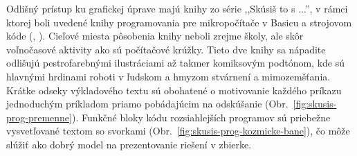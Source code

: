 Odlišný prístup ku grafickej úprave majú knihy zo série ,,Skúsiš to s ...'', v rámci ktorej boli uvedené knihy programovania pre mikropočítače v Basicu a strojovom kóde (\cite{tatchellova_skusis_1990}, \cite{wattsova_skusis_1991}). Cieľové miesta pôsobenia knihy neboli zrejme školy, ale skôr voľnočasové aktivity ako sú počítačové krúžky. Tieto dve knihy sa nápadite odlišujú pestrofarebnými ilustráciami až takmer komiksovým podtónom, kde sú hlavnými hrdinami roboti v ľudskom a hmyzom stvárnení a mimozemšťania. Krátke odseky výkladového textu sú obohatené o motivovanie každého príkazu jednoduchým príkladom priamo pobádajúcim na odskúšanie (Obr.~\ref{fig:skusis-prog-premenne}). Funkčné bloky kódu rozsiahlejších programov sú priebežne vysvetľované textom so svorkami (Obr.~\ref{fig:skusis-prog-kozmicke-bane}), čo môže slúžiť ako dobrý model na prezentovanie riešení v zbierke.

